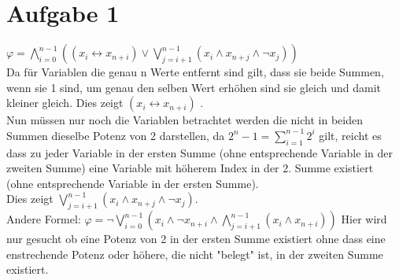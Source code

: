 \section*{Aufgabe 1}


$\varphi = \bigwedge_{i=0}^{n-1}((x_i \leftrightarrow x_{n+i}) \vee \bigvee_{j=i+1}^{n-1}( x_i \wedge x_{n+j} \wedge \neg x_{j}))$ \\



Da für Variablen die genau n Werte entfernt sind gilt, dass sie beide Summen, wenn sie 1 sind, um genau den selben Wert erhöhen sind sie gleich und damit kleiner gleich. Dies zeigt $(x_i \leftrightarrow x_{n+i})$ .\\


Nun müssen nur noch die Variablen betrachtet werden die nicht in beiden Summen dieselbe Potenz von 2 darstellen, da $2^n-1 = \sum_{i=1}^{n-1}2^i$ gilt, reicht es dass zu jeder Variable in der ersten Summe (ohne entsprechende Variable in der zweiten Summe)  eine Variable mit höherem Index in der 2. Summe  existiert (ohne entsprechende Variable in der ersten Summe).\\

Dies zeigt $ \bigvee_{j=i+1}^{n-1}( x_i \wedge x_{n+j} \wedge \neg x_{j})$. \\



Andere Formel: $ \varphi = \neg \bigvee_{i=0}^{n-1}(x_i \wedge \neg x_{n+i} \wedge \bigwedge_{j=i+1}^{n-1} (x_i \wedge x_{n+i}))$ 
Hier wird nur gesucht ob eine Potenz von 2 in der ersten Summe existiert ohne dass eine enstrechende Potenz oder höhere, die nicht "belegt" ist, in der zweiten Summe existiert.